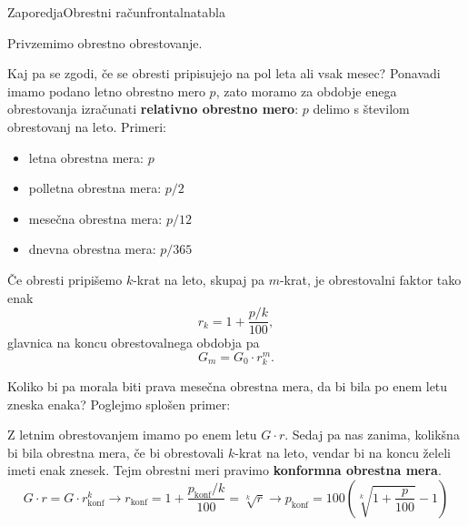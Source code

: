 \begin{priprava}{}{}{Zaporedja}{Obrestni račun}{frontalna}{tabla}

\newpage


Privzemimo obrestno obrestovanje.

Kaj pa se zgodi, če se obresti pripisujejo na pol leta ali vsak mesec? Ponavadi imamo podano letno obrestno mero $ p $, zato moramo za obdobje enega obrestovanja izračunati \textbf{relativno obrestno mero}: $ p $ delimo s številom obrestovanj na leto. Primeri:
\begin{itemize}
    \item letna obrestna mera: $ p $
    \item polletna obrestna mera: $ p/2 $
    \item mesečna obrestna mera: $ p/12 $
    \item dnevna obrestna mera: $ p/365 $
\end{itemize}

Če obresti pripišemo $ k $-krat na leto, skupaj pa $ m $-krat, je obrestovalni faktor tako enak
$$ r_k = 1 + \frac{p/k}{100}, $$
glavnica na koncu obrestovalnega obdobja pa
$$ G_m = G_0 \cdot r_k^m. $$


Koliko bi pa morala biti prava mesečna obrestna mera, da bi bila po enem letu zneska enaka? Poglejmo splošen primer:

Z letnim obrestovanjem imamo po enem letu $ G \cdot r $. Sedaj pa nas zanima, kolikšna bi bila obrestna mera, če bi obrestovali $ k $-krat na leto, vendar bi na koncu želeli imeti enak znesek. Tejm obrestni meri pravimo \textbf{konformna obrestna mera}.
$$ G \cdot r = G \cdot r_\text{konf}^k  \longrightarrow r_\text{konf} = 1 + \frac{p_\text{konf}/k}{100} = \sqrt[k]{r} \longrightarrow p_\text{konf} = 100 (\sqrt[k]{1+\frac{p}{100}} - 1)$$


\end{priprava}

